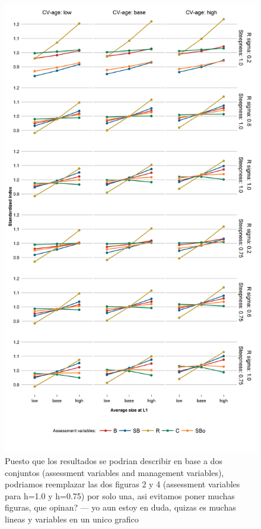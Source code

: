 \begin{figure}[hbtp]
	\begin{center}
\includegraphics[width=0.70\columnwidth]{figures/steepness-tot-estado.png}
  \end{center}
\caption{Puesto que los resultados se podrian describir en base a dos conjuntos (assessment variables and management variables), podriamos reemplazar las dos figuras 2 y 4 (assessment variables para h=1.0 y h=0.75) por solo una, asi evitamos poner muchas figuras, que opinan? --- yo aun estoy en duda, quizas es muchas lineas y variables en un unico grafico}
\label{figureA}
\end{figure}






